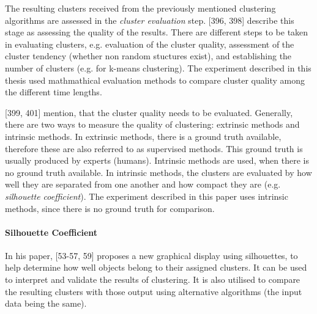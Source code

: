The resulting clusters received from the previously mentioned clustering algorithms are assessed in the \textit{cluster evaluation} step. \textcite{han2011data}[396, 398] describe this stage as assessing the quality of the results.
There are different steps to be taken in evaluating clusters, e.g. evaluation of the cluster quality, assessment of the cluster tendency (whether non random stuctures exist), and establishing the number of clusters (e.g. for k-means clustering). The experiment described in this thesis used mathmathical evaluation methods to compare cluster quality among the different time lengths. 
 

 

  \textcite{han2011data}[399, 401] mention, that the cluster quality needs to be evaluated. Generally, there are two ways to measure the quality of clustering: extrinsic methods and intrinsic methods. In extrinsic methods, there is a ground truth available, therefore these are also referred to as supervised methods. This ground truth is usually produced by experts (humans). Intrinsic methods are used, when there is no ground truth available. In intrinsic methods, the clusters are evaluated by how well they are separated from one another and how compact they are (e.g. \textit{silhouette coefficient}).
  The experiment described in this paper uses intrinsic methods, since there is no ground truth for comparison.
  
  
  \paragraph{Silhouette Coefficient}
  \label{section:silhouetteCoefficient}
  In his paper, \textcite{rousseeuw1987silhouettes}[53-57, 59] proposes a new graphical display using silhouettes, to help determine how well objects belong to their assigned clusters. It can be used to interpret and validate the results of clustering. It is also utilised to compare the resulting clusters with those output using alternative algorithms (the input data being the same). 
  
